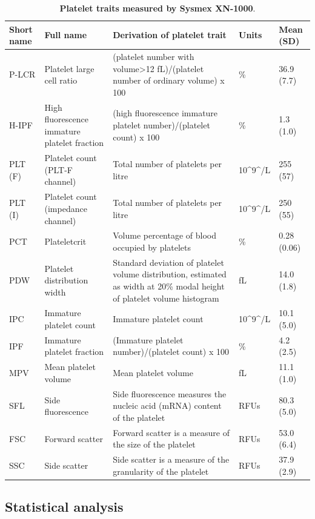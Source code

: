 \documentclass[11pt,twoside]{bristolthesis}
\begin{document}
\begin{landscape}\begin{table}

\caption[Platelet traits measured by Sysmex XN-1000]{\label{tab:Platelet-traits}\textbf{Platelet traits measured by Sysmex XN-1000}.}
\centering
\begin{tabu} to 
\toprule
Short name & Full name & Derivation of platelet trait & Units & Mean (SD)\\
\midrule
P-LCR & Platelet large cell ratio & (platelet number with volume>12 fL)/(platelet number of ordinary volume)  x 100 & \% & 36.9 (7.7)\\
H-IPF & High fluorescence immature platelet fraction & (high fluorescence immature platelet number)/(platelet count)  x 100 & \% & 1.3 (1.0)\\
PLT (F) & Platelet count (PLT-F channel) & Total number of platelets per litre & 10\textasciicircum{}9\textasciicircum{}/L & 255 (57)\\
PLT (I) & Platelet count (impedance channel) & Total number of platelets per litre & 10\textasciicircum{}9\textasciicircum{}/L & 250 (55)\\
PCT & Plateletcrit & Volume percentage of blood occupied by platelets & \% & 0.28 (0.06)\\
\addlinespace
PDW & Platelet distribution width & Standard deviation of platelet volume distribution, estimated as width at 20\% modal height of platelet volume histogram & fL & 14.0 (1.8)\\
IPC & Immature platelet count & Immature platelet count & 10\textasciicircum{}9\textasciicircum{}/L & 10.1 (5.0)\\
IPF & Immature platelet fraction & (Immature platelet number)/(platelet count)   x 100 & \% & 4.2 (2.5)\\
MPV & Mean platelet volume & Mean platelet volume & fL & 11.1 (1.0)\\
SFL & Side fluorescence & Side fluorescence measures the nucleic acid (mRNA) content of the platelet & RFUs & 80.3 (5.0)\\
\addlinespace
FSC & Forward scatter & Forward scatter is a measure of the size of the platelet & RFUs & 53.0 (6.4)\\
SSC & Side scatter & Side scatter is a measure of the granularity of the platelet & RFUs & 37.9 (2.9)\\
\bottomrule
\end{tabu}
\end{table}
\end{landscape}
\hypertarget{statistical-analysis}{%
\subsection{Statistical analysis}\label{statistical-analysis}}
\end{document}
